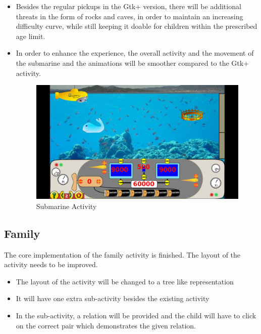 \documentclass[preprint,12pt]{elsarticle}
\begin{document}
\begin{itemize}
\item Besides the regular pickups in the Gtk+ version, there will be additional threats in the form of rocks and caves, in order to maintain an increasing difficulty curve, while still keeping it doable for children within the prescribed age limit.

\item In order to enhance the experience, the overall activity and the movement of the submarine and the animations will be smoother compared to the Gtk+ activity.

\begin{figure}[H]
\centering\includegraphics[width=1.0\linewidth]{submarine}
\caption{Submarine Activity}
\end{figure}

\end{itemize}

\subsection{Family}

The core implementation of the family activity is finished. The layout of the activity needs to be improved.

\begin{itemize}


\item The layout of the activity will be changed to a tree like representation
\item It will have one extra sub-activity besides the existing activity
\item In the sub-activity, a relation will be provided and the child will have to click on the correct pair which demonstrates the given relation.

\end{itemize}
\end{document}
